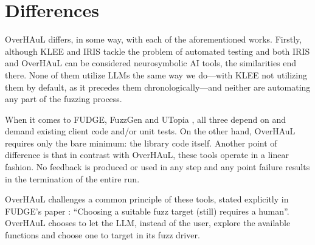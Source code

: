 \documentclass[
  a4paper,
  DIV=11,
  numbers=noendperiod]{scrreprt}
\theoremstyle{definition}
\theoremstyle{remark}
\begin{document}
\section{Differences}\label{sec-differences}

OverHAuL differs, in some way, with each of the aforementioned works.
Firstly, although KLEE and IRIS \autocite{iris,klee} tackle the problem
of automated testing and both IRIS and OverHAuL can be considered
neurosymbolic AI tools, the similarities end there. None of them utilize
LLMs the same way we do---with KLEE not utilizing them by default, as it
precedes them chronologically---and neither are automating any part of
the fuzzing process.

When it comes to FUDGE, FuzzGen and UTopia
\autocite{utopia,fuzzgen,fudge}, all three depend on and demand existing
client code and/or unit tests. On the other hand, OverHAuL requires only
the bare minimum: the library code itself. Another point of difference
is that in contrast with OverHAuL, these tools operate in a linear
fashion. No feedback is produced or used in any step and any point
failure results in the termination of the entire run.

OverHAuL challenges a common principle of these tools, stated explicitly
in FUDGE's paper \autocite{fudge}: ``Choosing a suitable fuzz target
(still) requires a human''. OverHAuL chooses to let the LLM, instead of
the user, explore the available functions and choose one to target in
its fuzz driver.
\end{document}
